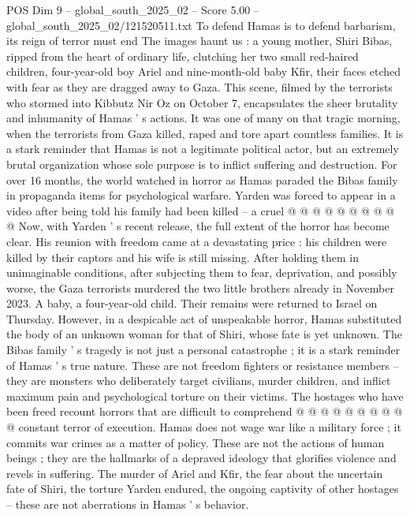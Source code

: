\begin{textsample}{POS Dim 9 – global\_south\_2025\_02 – Score 5.00 – global\_south\_2025\_02/121520511.txt}  \label{ex:f9_pos_396}
To defend Hamas is to defend barbarism, its reign of terror must end The images haunt us : a young mother, Shiri Bibas, ripped from the heart of ordinary life, clutching her two small red-haired children, four-year-old boy Ariel and nine-month-old baby Kfir, their faces etched with fear as they are dragged away to Gaza.
This scene, filmed by the terrorists who stormed into Kibbutz Nir Oz on October 7, encapsulates the sheer brutality and inhumanity of Hamas ' s actions.
It was one of many on that tragic morning, when the terrorists from Gaza killed, raped and tore apart countless families.
It is a stark reminder that Hamas is not a legitimate political actor, but an extremely brutal organization whose sole purpose is to inflict suffering and destruction.
For over 16 months, the world watched in horror as Hamas paraded the Bibas family in propaganda items for psychological warfare.
Yarden was forced to appear in a video after being told his family had been killed -- a cruel @ @ @ @ @ @ @ @ @ @ Now, with Yarden ' s recent release, the full extent of the horror has become clear.
His reunion with freedom came at a devastating price : his children were killed by their captors and his wife is still missing.
After holding them in unimaginable conditions, after subjecting them to fear, deprivation, and possibly worse, the Gaza terrorists murdered the two little brothers already in November 2023.
A baby, a four-year-old child.
Their remains were returned to Israel on Thursday.
However, in a despicable act of unspeakable horror, Hamas substituted the body of an unknown woman for that of Shiri, whose fate is yet unknown.
The Bibas family ' s tragedy is not just a personal catastrophe ; it is a stark reminder of Hamas ' s true nature.
These are not freedom fighters or resistance members -- they are monsters who deliberately target civilians, murder children, and inflict maximum pain and psychological torture on their victims.
The hostages who have been freed recount horrors that are difficult to comprehend @ @ @ @ @ @ @ @ @ @ constant terror of execution.
Hamas does not wage war like a military force ; it commits war crimes as a matter of policy.
These are not the actions of human beings ; they are the hallmarks of a depraved ideology that glorifies violence and revels in suffering.
The murder of Ariel and Kfir, the fear about the uncertain fate of Shiri, the torture Yarden endured, the ongoing captivity of other hostages -- these are not aberrations in Hamas ' s behavior.

\end{textsample}

